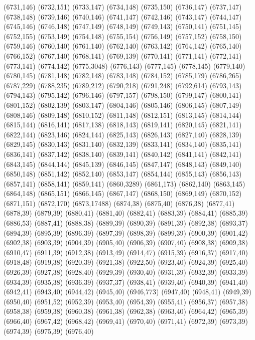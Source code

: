 (6731,146)
(6732,151)
(6733,147)
(6734,148)
(6735,150)
(6736,147)
(6737,147)
(6738,148)
(6739,146)
(6740,146)
(6741,147)
(6742,146)
(6743,147)
(6744,147)
(6745,146)
(6746,148)
(6747,149)
(6748,149)
(6749,143)
(6750,141)
(6751,145)
(6752,155)
(6753,149)
(6754,148)
(6755,154)
(6756,149)
(6757,152)
(6758,150)
(6759,146)
(6760,140)
(6761,140)
(6762,140)
(6763,142)
(6764,142)
(6765,140)
(6766,152)
(6767,140)
(6768,141)
(6769,139)
(6770,141)
(6771,141)
(6772,141)
(6773,141)
(6774,142)
(6775,3048)
(6776,143)
(6777,145)
(6778,145)
(6779,140)
(6780,145)
(6781,148)
(6782,148)
(6783,148)
(6784,152)
(6785,179)
(6786,265)
(6787,229)
(6788,235)
(6789,212)
(6790,218)
(6791,248)
(6792,614)
(6793,143)
(6794,143)
(6795,142)
(6796,146)
(6797,157)
(6798,150)
(6799,147)
(6800,141)
(6801,152)
(6802,139)
(6803,147)
(6804,146)
(6805,146)
(6806,145)
(6807,149)
(6808,146)
(6809,148)
(6810,152)
(6811,148)
(6812,151)
(6813,145)
(6814,144)
(6815,144)
(6816,141)
(6817,138)
(6818,143)
(6819,141)
(6820,145)
(6821,141)
(6822,144)
(6823,146)
(6824,144)
(6825,143)
(6826,143)
(6827,140)
(6828,139)
(6829,145)
(6830,143)
(6831,140)
(6832,139)
(6833,141)
(6834,140)
(6835,141)
(6836,141)
(6837,142)
(6838,140)
(6839,141)
(6840,142)
(6841,141)
(6842,141)
(6843,145)
(6844,144)
(6845,139)
(6846,145)
(6847,147)
(6848,143)
(6849,140)
(6850,148)
(6851,142)
(6852,140)
(6853,147)
(6854,144)
(6855,143)
(6856,143)
(6857,141)
(6858,141)
(6859,141)
(6860,3289)
(6861,173)
(6862,140)
(6863,145)
(6864,148)
(6865,151)
(6866,145)
(6867,147)
(6868,150)
(6869,149)
(6870,152)
(6871,151)
(6872,170)
(6873,17488)
(6874,38)
(6875,40)
(6876,38)
(6877,41)
(6878,39)
(6879,39)
(6880,41)
(6881,40)
(6882,41)
(6883,39)
(6884,41)
(6885,39)
(6886,53)
(6887,41)
(6888,38)
(6889,39)
(6890,39)
(6891,39)
(6892,38)
(6893,37)
(6894,39)
(6895,39)
(6896,39)
(6897,39)
(6898,39)
(6899,39)
(6900,39)
(6901,42)
(6902,38)
(6903,39)
(6904,39)
(6905,40)
(6906,39)
(6907,40)
(6908,38)
(6909,38)
(6910,47)
(6911,39)
(6912,38)
(6913,49)
(6914,47)
(6915,39)
(6916,37)
(6917,40)
(6918,48)
(6919,38)
(6920,39)
(6921,38)
(6922,50)
(6923,40)
(6924,39)
(6925,40)
(6926,39)
(6927,38)
(6928,40)
(6929,39)
(6930,40)
(6931,39)
(6932,39)
(6933,39)
(6934,39)
(6935,38)
(6936,39)
(6937,37)
(6938,41)
(6939,40)
(6940,39)
(6941,40)
(6942,41)
(6943,40)
(6944,42)
(6945,40)
(6946,773)
(6947,40)
(6948,41)
(6949,39)
(6950,40)
(6951,52)
(6952,39)
(6953,40)
(6954,39)
(6955,41)
(6956,37)
(6957,38)
(6958,38)
(6959,38)
(6960,38)
(6961,38)
(6962,38)
(6963,40)
(6964,42)
(6965,39)
(6966,40)
(6967,42)
(6968,42)
(6969,41)
(6970,40)
(6971,41)
(6972,39)
(6973,39)
(6974,39)
(6975,39)
(6976,40)
